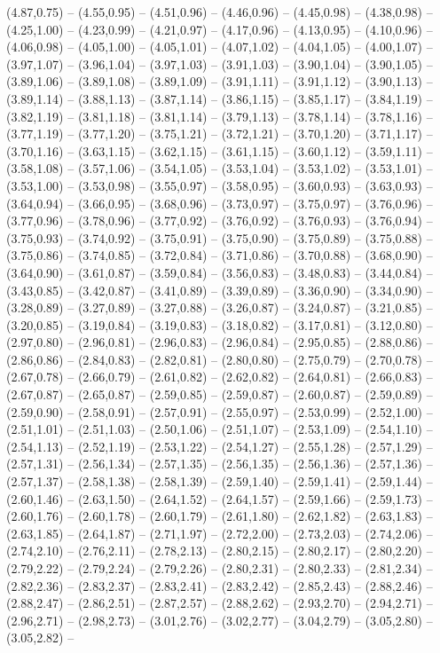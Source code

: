 \expandafter\def\csname geo:gebiet:DE-BW\endcsname{
  (4.87,0.75) -- (4.55,0.95) -- (4.51,0.96) -- (4.46,0.96) -- (4.45,0.98) -- (4.38,0.98) -- (4.25,1.00) -- (4.23,0.99) -- (4.21,0.97) -- (4.17,0.96) -- (4.13,0.95) -- (4.10,0.96) -- (4.06,0.98) -- (4.05,1.00) -- (4.05,1.01) -- (4.07,1.02) -- (4.04,1.05) -- (4.00,1.07) -- (3.97,1.07) -- (3.96,1.04) -- (3.97,1.03) -- (3.91,1.03) -- (3.90,1.04) -- (3.90,1.05) -- (3.89,1.06) -- (3.89,1.08) -- (3.89,1.09) -- (3.91,1.11) -- (3.91,1.12) -- (3.90,1.13) -- (3.89,1.14) -- (3.88,1.13) -- (3.87,1.14) -- (3.86,1.15) -- (3.85,1.17) -- (3.84,1.19) -- (3.82,1.19) -- (3.81,1.18) -- (3.81,1.14) -- (3.79,1.13) -- (3.78,1.14) -- (3.78,1.16) -- (3.77,1.19) -- (3.77,1.20) -- (3.75,1.21) -- (3.72,1.21) -- (3.70,1.20) -- (3.71,1.17) -- (3.70,1.16) -- (3.63,1.15) -- (3.62,1.15) -- (3.61,1.15) -- (3.60,1.12) -- (3.59,1.11) -- (3.58,1.08) -- (3.57,1.06) -- (3.54,1.05) -- (3.53,1.04) -- (3.53,1.02) -- (3.53,1.01) -- (3.53,1.00) -- (3.53,0.98) -- (3.55,0.97) -- (3.58,0.95) -- (3.60,0.93) -- (3.63,0.93) -- (3.64,0.94) -- (3.66,0.95) -- (3.68,0.96) -- (3.73,0.97) -- (3.75,0.97) -- (3.76,0.96) -- (3.77,0.96) -- (3.78,0.96) -- (3.77,0.92) -- (3.76,0.92) -- (3.76,0.93) -- (3.76,0.94) -- (3.75,0.93) -- (3.74,0.92) -- (3.75,0.91) -- (3.75,0.90) -- (3.75,0.89) -- (3.75,0.88) -- (3.75,0.86) -- (3.74,0.85) -- (3.72,0.84) -- (3.71,0.86) -- (3.70,0.88) -- (3.68,0.90) -- (3.64,0.90) -- (3.61,0.87) -- (3.59,0.84) -- (3.56,0.83) -- (3.48,0.83) -- (3.44,0.84) -- (3.43,0.85) -- (3.42,0.87) -- (3.41,0.89) -- (3.39,0.89) -- (3.36,0.90) -- (3.34,0.90) -- (3.28,0.89) -- (3.27,0.89) -- (3.27,0.88) -- (3.26,0.87) -- (3.24,0.87) -- (3.21,0.85) -- (3.20,0.85) -- (3.19,0.84) -- (3.19,0.83) -- (3.18,0.82) -- (3.17,0.81) -- (3.12,0.80) -- (2.97,0.80) -- (2.96,0.81) -- (2.96,0.83) -- (2.96,0.84) -- (2.95,0.85) -- (2.88,0.86) -- (2.86,0.86) -- (2.84,0.83) -- (2.82,0.81) -- (2.80,0.80) -- (2.75,0.79) -- (2.70,0.78) -- (2.67,0.78) -- (2.66,0.79) -- (2.61,0.82) -- (2.62,0.82) -- (2.64,0.81) -- (2.66,0.83) -- (2.67,0.87) -- (2.65,0.87) -- (2.59,0.85) -- (2.59,0.87) -- (2.60,0.87) -- (2.59,0.89) -- (2.59,0.90) -- (2.58,0.91) -- (2.57,0.91) -- (2.55,0.97) -- (2.53,0.99) -- (2.52,1.00) -- (2.51,1.01) -- (2.51,1.03) -- (2.50,1.06) -- (2.51,1.07) -- (2.53,1.09) -- (2.54,1.10) -- (2.54,1.13) -- (2.52,1.19) -- (2.53,1.22) -- (2.54,1.27) -- (2.55,1.28) -- (2.57,1.29) -- (2.57,1.31) -- (2.56,1.34) -- (2.57,1.35) -- (2.56,1.35) -- (2.56,1.36) -- (2.57,1.36) -- (2.57,1.37) -- (2.58,1.38) -- (2.58,1.39) -- (2.59,1.40) -- (2.59,1.41) -- (2.59,1.44) -- (2.60,1.46) -- (2.63,1.50) -- (2.64,1.52) -- (2.64,1.57) -- (2.59,1.66) -- (2.59,1.73) -- (2.60,1.76) -- (2.60,1.78) -- (2.60,1.79) -- (2.61,1.80) -- (2.62,1.82) -- (2.63,1.83) -- (2.63,1.85) -- (2.64,1.87) -- (2.71,1.97) -- (2.72,2.00) -- (2.73,2.03) -- (2.74,2.06) -- (2.74,2.10) -- (2.76,2.11) -- (2.78,2.13) -- (2.80,2.15) -- (2.80,2.17) -- (2.80,2.20) -- (2.79,2.22) -- (2.79,2.24) -- (2.79,2.26) -- (2.80,2.31) -- (2.80,2.33) -- (2.81,2.34) -- (2.82,2.36) -- (2.83,2.37) -- (2.83,2.41) -- (2.83,2.42) -- (2.85,2.43) -- (2.88,2.46) -- (2.88,2.47) -- (2.86,2.51) -- (2.87,2.57) -- (2.88,2.62) -- (2.93,2.70) -- (2.94,2.71) -- (2.96,2.71) -- (2.98,2.73) -- (3.01,2.76) -- (3.02,2.77) -- (3.04,2.79) -- (3.05,2.80) -- (3.05,2.82) -- }
